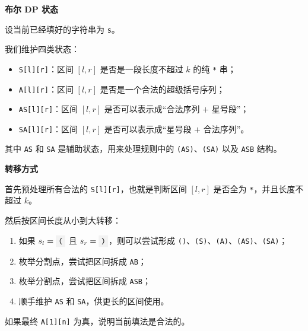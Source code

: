 \documentclass{book}
\newcommand{\code}[1]{\colorbox{codebg}{\texttt{#1}}}  %
\begin{document}
\par\medskip
\noindent\textbf{布尔 DP 状态}
\par\medskip

设当前已经填好的字符串为 \code{s}。

我们维护四类状态：

\begin{itemize}[leftmargin=2em,itemsep=1pt,topsep=2pt,parsep=0pt,partopsep=0pt]
    \item \code{S[l][r]}：区间 $[l,r]$ 是否是一段长度不超过 $k$ 的纯 \code{*} 串；
    \item \code{A[l][r]}：区间 $[l,r]$ 是否是一个合法的超级括号序列；
    \item \code{AS[l][r]}：区间 $[l,r]$ 是否可以表示成“合法序列 $+$ 星号段”；
    \item \code{SA[l][r]}：区间 $[l,r]$ 是否可以表示成“星号段 $+$ 合法序列”。
\end{itemize}

其中 \code{AS} 和 \code{SA} 是辅助状态，用来处理规则中的 \code{(AS)}、\code{(SA)} 以及 \code{ASB} 结构。

\par\medskip
\noindent\textbf{转移方式}
\par\medskip

首先预处理所有合法的 \code{S[l][r]}，也就是判断区间 $[l,r]$ 是否全为 \code{*}，并且长度不超过 $k$。

然后按区间长度从小到大转移：

\begin{enumerate}[leftmargin=2em,itemsep=1pt,topsep=2pt,parsep=0pt,partopsep=0pt]
    \item 如果 $s_l=\code{(}$ 且 $s_r=\code{)}$，则可以尝试形成 \code{()}、\code{(S)}、\code{(A)}、\code{(AS)}、\code{(SA)}；
    \item 枚举分割点，尝试把区间拆成 \code{AB}；
    \item 枚举分割点，尝试把区间拆成 \code{ASB}；
    \item 顺手维护 \code{AS} 和 \code{SA}，供更长的区间使用。
\end{enumerate}

如果最终 \code{A[1][n]} 为真，说明当前填法是合法的。
\end{document}
